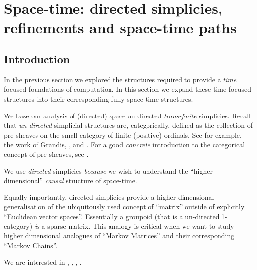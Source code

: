
\chapter{Space-time: directed simplicies, refinements and space-time paths}

\section{Introduction}

In the previous section we explored the structures required to provide a \emph{time} focused 
foundations of computation. In this section we expand these time focused structures into 
their corresponding fully space-time structures.

We base our analysis of (directed) space on directed \emph{trans-finite} simplicies.
Recall that \emph{un-directed} simplicial structures are, categorically, defined as the
collection of pre-sheaves on the small category of finite (positive) ordinals. See for
example, the work of Grandis, \cite{grandis2001symSimpSets}, and
\cite{grandis2001fundamentalFunctorsSimplicial}. For a good \emph{concrete} introduction
to the categorical concept of pre-sheaves, see \cite{reyesReyesZolfaghari2004presheaves}.

We use \emph{directed} simplicies \emph{because} we wish to understand the ``higher
dimensional'' \emph{causal} structure of space-time.

Equally importantly, directed simplicies provide a higher dimensional generalisation of
the ubiquitously used concept of ``matrix'' outside of explicitly ``Euclidean vector
spaces''. Essentially a groupoid (that is a un-directed 1-category) \emph{is} a sparse
matrix. This analogy is critical when we want to study higher dimensional analogues of
``Markov Matrices'' and their corresponding ``Markov Chains''.


We are interested in , , , .


